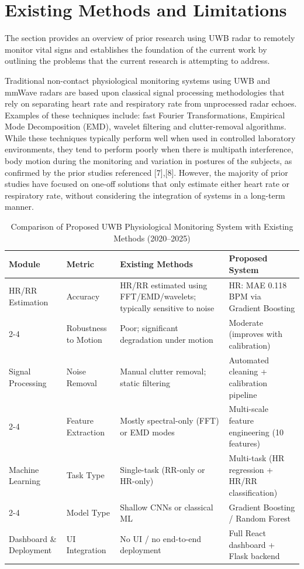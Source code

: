 \documentclass[conference]{IEEEtran}
\begin{document}
\section{Existing Methods and Limitations}

The section provides an overview of prior research using UWB radar to remotely monitor vital signs and establishes the foundation of the current work by outlining the problems that the current research is attempting to address.

Traditional non-contact physiological monitoring systems using UWB and mmWave radars are based upon classical signal processing methodologies that rely on separating heart rate and respiratory rate from unprocessed radar echoes. Examples of these techniques include: fast Fourier Transformations, Empirical Mode Decomposition (EMD), wavelet filtering and clutter-removal algorithms. While these techniques typically perform well when used in controlled laboratory environments, they tend to perform poorly when there is multipath interference, body motion during the monitoring and variation in postures of the subjects, as confirmed by the prior studies referenced [7],[8]. However, the majority of prior studies have focused on one-off solutions that only estimate either heart rate or respiratory rate, without considering the integration of systems in a long-term manner.

\begin{table}[!t]
\centering
\caption{Comparison of Proposed UWB Physiological Monitoring System with Existing Methods (2020--2025)}
\label{tab:comparison}
\renewcommand{\arraystretch}{1.3}
\begin{tabular}{|l|l|p{4.2cm}|p{4.5cm}|}
\hline
\textbf{Module} & \textbf{Metric} & \textbf{Existing Methods} & \textbf{Proposed System} \\
\hline
HR/RR Estimation & Accuracy & HR/RR estimated using FFT/EMD/wavelets; typically sensitive to noise & HR: MAE 0.118 BPM via Gradient Boosting \\
\cline{2-4}
 & Robustness to Motion & Poor; significant degradation under motion & Moderate (improves with calibration) \\
\hline
Signal Processing & Noise Removal & Manual clutter removal; static filtering & Automated cleaning + calibration pipeline \\
\cline{2-4}
 & Feature Extraction & Mostly spectral-only (FFT) or EMD modes & Multi-scale feature engineering (10 features) \\
\hline
Machine Learning & Task Type & Single-task (RR-only or HR-only) & Multi-task (HR regression + HR/RR classification) \\
\cline{2-4}
 & Model Type & Shallow CNNs or classical ML & Gradient Boosting / Random Forest \\
\hline
Dashboard \& Deployment & UI Integration & No UI / no end-to-end deployment & Full React dashboard + Flask backend \\
\hline
\end{tabular}
\end{table}
\end{document}
